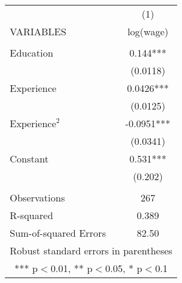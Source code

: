 \begin{tabular}{lc} \hline
 & (1) \\
VARIABLES & log(wage) \\ \hline
 &  \\
Education & 0.144*** \\
 & (0.0118) \\
Experience & 0.0426*** \\
 & (0.0125) \\
$\text{Experience}^2$ & -0.0951*** \\
 & (0.0341) \\
Constant & 0.531*** \\
 & (0.202) \\
 &  \\
Observations & 267 \\
R-squared & 0.389 \\
 Sum-of-squared Errors & 82.50 \\ \hline
\multicolumn{2}{c}{ Robust standard errors in parentheses} \\
\multicolumn{2}{c}{ *** p$<$0.01, ** p$<$0.05, * p$<$0.1} \\
\end{tabular}
